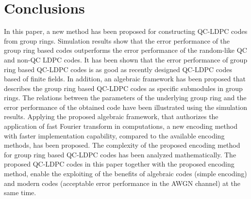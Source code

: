 \documentclass[journal,draftclsnofoot,onecolumn,12pt,twoside]{IEEEtran}
\begin{document}
\section{Conclusions}\label{conclusion}
In this paper, a new method has been proposed for constructing QC-LDPC codes from group rings. Simulation results show that the error performance of the group ring based codes outperforms the error performance of the random-like QC and non-QC LDPC codes. It has been shown that the error performance of group ring based QC-LDPC codes is as good as recently designed QC-LDPC codes based of finite fields. In addition, an algebraic framework has been proposed that describes the group ring based QC-LDPC codes as specific submodules in group rings. The relations between the parameters of the underlying group ring and the error performance of the obtained code have been illustrated using the simulation results. Applying the proposed algebraic framework, that authorizes the application of fast Fourier transform in computations, a new encoding method with faster implementation capability, compared to the available encoding methods, has been  proposed. The complexity of the proposed encoding method for group ring based QC-LDPC codes has been analyzed mathematically.  The proposed QC-LDPC codes in this paper together with the proposed encoding method, enable the exploiting of the benefits of algebraic codes (simple encoding) and modern codes (acceptable error performance in the AWGN channel) at the same time.



\end{document}
